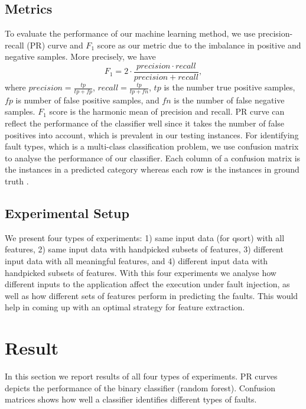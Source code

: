 \subsection{Metrics}
To evaluate the performance of our machine learning method, we use precision-recall (PR) curve and $F_1$ score as our metric due to the imbalance in positive and negative samples. More precisely, we have
\begin{equation}
F_{1} = 2\cdot\frac{precision \cdot recall}{precision + recall},
\end{equation}
where $precision = \frac{tp}{tp+fp}$, $recall = \frac{tp}{tp+fn}$, $tp$ is the number true positive samples, $fp$ is number of false positive samples, and $fn$ is the number of false negative samples. $F_1$ score is the harmonic mean of precision and recall. PR curve can reflect the performance of the classifier well since it takes the number of false positives into account, which is prevalent in our testing instances. For identifying fault types, which is a multi-class classification problem, we use confusion matrix to analyse the performance of our classifier. Each column of a confusion matrix is the instances in a predicted category whereas each row is the instances in ground truth \cite{powers2011evaluation}.

\subsection{Experimental Setup}
We present four types of experiments: 1) same input data (for qsort) with all features, 2) same input data with handpicked subsets of features, 3) different input data with all meaningful features, and 4) different input data with handpicked subsets of features. With this four experiments we analyse how different inputs to the application affect the execution under fault injection, as well as how different sets of features perform in predicting the faults. This would help in coming up with an optimal strategy for feature extraction.

\section{Result}
In this section we report results of all four types of experiments. PR curves depicts the performance of the binary classifier (random forest). Confusion matrices shows how well a classifier identifies different types of faults.

